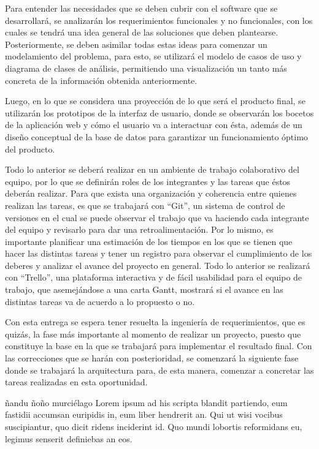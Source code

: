 \documentclass{memoria}
\begin{document}
Para entender las necesidades que se deben cubrir con el software que se desarrollará, se analizarán los requerimientos funcionales y no funcionales, con los cuales se tendrá una idea general de las soluciones que deben plantearse. Posteriormente, se deben asimilar todas estas ideas para comenzar un modelamiento del problema, para esto, se utilizará el modelo de casos de uso y diagrama de clases de análisis, permitiendo una visualización un tanto más concreta de la información obtenida anteriormente.

Luego, en lo que se considera una proyección de lo que será el producto final, se utilizarán los prototipos de la interfaz de usuario, donde se observarán los bocetos de la aplicación web y cómo el usuario va a interactuar con ésta, además de un diseño conceptual de la base de datos para garantizar un funcionamiento óptimo del producto.
 
Todo lo anterior se deberá realizar en un ambiente de trabajo colaborativo del equipo, por lo que se definirán roles de los integrantes y las tareas que éstos deberán realizar. Para que exista una organización y coherencia entre quienes realizan las tareas, es que se trabajará con “Git”, un sistema de control de versiones en el cual se puede observar el trabajo que va haciendo cada integrante del equipo y revisarlo para dar una retroalimentación. Por lo mismo, es importante planificar una estimación de los tiempos en los que se tienen que hacer las distintas tareas y tener un registro para observar el cumplimiento de los deberes y analizar el avance del proyecto en general. Todo lo anterior se realizará con “Trello”, una plataforma interactiva y de fácil usabilidad para el equipo de trabajo, que asemejándose a una carta Gantt, mostrará si el avance en las distintas tareas va de acuerdo a lo propuesto o no.

Con esta entrega se espera tener resuelta la ingeniería de requerimientos, que es quizás, la fase más importante al momento de realizar un proyecto, puesto que constituye la base en la que se trabajará para implementar el resultado final. Con las correcciones que se harán con posterioridad, se comenzará la siguiente fase donde se trabajará la arquitectura para, de esta manera, comenzar a concretar las tareas realizadas en esta oportunidad.   



ñandu ñoño murciélago Lorem ipsum ad his scripta blandit partiendo, eum fastidii accumsan euripidis
in, eum liber hendrerit an. Qui ut wisi vocibus suscipiantur, quo dicit ridens
inciderint id. Quo mundi lobortis reformidans eu, legimus senserit definiebas an
eos. 
\end{document}
